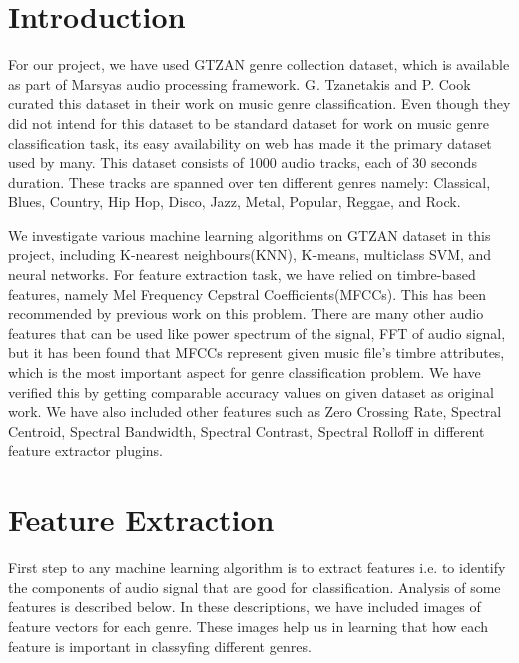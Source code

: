 \documentclass[conference]{IEEEtran}
\begin{document}
\section{Introduction}
For our project, we have used GTZAN genre collection dataset, which is available as part of Marsyas audio processing framework. G. Tzanetakis and P. Cook curated this dataset in their work\cite{gtzan} on music genre classification. Even though they did not intend for this dataset to be standard dataset for work on music genre classification task\cite{bob}, its easy availability on web has made it the primary dataset used by many\cite{michael}\cite{bob}\cite{base}. This dataset consists of 1000 audio tracks, each of 30 seconds duration. These tracks are spanned over ten different genres namely: Classical, Blues, Country, Hip Hop, Disco, Jazz, Metal, Popular, Reggae, and Rock.\par
We investigate various machine learning algorithms on GTZAN dataset in this project, including K-nearest neighbours(KNN), K-means, multiclass SVM, and neural networks. For feature extraction task, we have relied on timbre-based features, namely Mel Frequency Cepstral Coefficients(MFCCs). This has been recommended by previous work on this problem\cite{zu}. There are many other audio features that can be used like power spectrum of the signal, FFT of audio signal, but it has been found that MFCCs represent given music file's timbre attributes, which is the most important aspect for genre classification problem. We have verified this by getting comparable accuracy values on given dataset as original work\cite{gtzan}. We have also included other features such as Zero Crossing Rate, Spectral Centroid, Spectral Bandwidth, Spectral Contrast, Spectral Rolloff in different feature extractor plugins.


\section{Feature Extraction}
First step to any machine learning algorithm is to extract features i.e. to identify the components of audio signal that are good for classification.
Analysis of some features is described below. In these descriptions, we have included images of feature vectors for each genre. These images help us in learning that how each feature is important in classyfing different genres.
\end{document}
